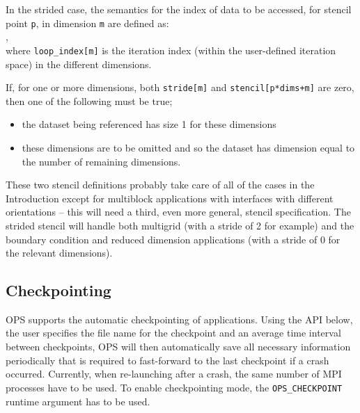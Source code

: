 \documentclass[11pt]{article}
\begin{document}
{\vspace{0.2in}

\noindent In the strided case, the semantics for the index of data to be accessed, for stencil point {\tt p}, in dimension \texttt{m} are defined as:\\

,\\

\noindent where \texttt{loop\_index[m]} is the iteration index (within the user-defined iteration space) in the different dimensions.

\noindent If, for one or more dimensions, both {\tt stride[m]} and {\tt stencil[p*dims+m]} are zero, then one of the
following must be true;
\begin{itemize}
\item
the dataset being referenced has size 1 for these dimensions
\item
these dimensions are to be omitted and so the dataset has 
dimension equal to the number of remaining dimensions.
\end{itemize}

\noindent These two stencil definitions probably take care of all of the cases in the Introduction except for 
multiblock applications with interfaces with different orientations -- this will need a third, even more general, 
stencil specification. \noindent The strided stencil will handle both multigrid (with a stride of 2 for example) and 
the boundary condition and reduced dimension applications (with a stride of 0 for the relevant dimensions).

\subsection{Checkpointing}
OPS supports the automatic checkpointing of applications. Using the API below, the user specifies the file name for the 
checkpoint and an average time interval between checkpoints, OPS will then automatically save all necessary information 
periodically that is required to fast-forward to the last checkpoint if a crash occurred. Currently, when re-launching 
after a crash, the same number of MPI processes have to be used. To enable checkpointing mode, the {\tt OPS\_CHECKPOINT} 
runtime argument has to be used.\\

}
\end{document}
